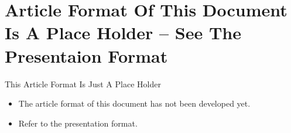 \section{Article Format Of This Document Is A Place Holder -- See The Presentaion Format}

\begin{frame}{This Article Format Is Just A Place Holder}{}
  \begin{itemize}

  \item The article format of this document has not been developed yet.

  \item Refer to the presentation format.
  \end{itemize}
\end{frame}


\begin{comment}
*  [[elisp:(org-cycle)][| ]]  Local Vars  ::                  *Org-Mode And Emacs Specific Configurations*   [[elisp:(org-cycle)][| ]]
\end{comment}



